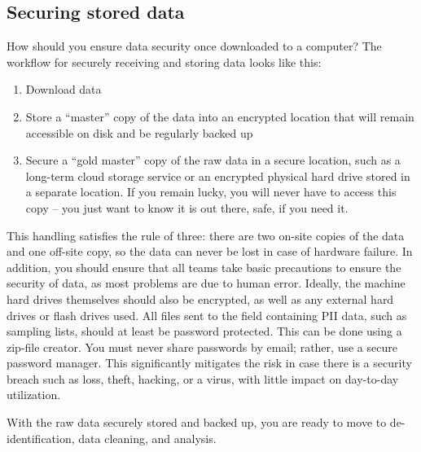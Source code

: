 \subsection{Securing stored data}
How should you ensure data security once downloaded to a computer? 
The workflow for securely receiving and storing data looks like this:

\begin{enumerate}
	\item Download data
	\item Store a ``master'' copy of the data into an encrypted location that will remain accessible on disk and be regularly backed up
	\item Secure a ``gold master'' copy of the raw data in a secure location, such as a long-term cloud storage service or an encrypted physical hard drive stored in a separate location. If you remain lucky, you will never have to access this copy -- you just want to know it is out there, safe, if you need it.
	
\end{enumerate}

This handling satisfies the rule of three: there are two on-site copies of the data and one off-site copy, so the data can never be lost in case of hardware failure. In addition, you should ensure that all teams take basic precautions to ensure the security of data, as most problems are due to human error.
Ideally, the machine hard drives themselves should also be encrypted, as well as any external hard drives or flash drives used. All files sent to the field containing PII data, such as sampling lists, should at least be password protected. This can be done using a zip-file creator.
You must never share passwords by email; rather, use a secure password manager. This significantly mitigates the risk in case there is a security breach such as loss, theft, hacking, or a virus, with little impact on day-to-day utilization.

With the raw data securely stored and backed up, you are ready to move to de-identification, data cleaning, and analysis.



